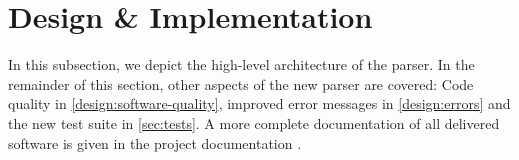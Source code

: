
\section{Design \& Implementation}
In this subsection, we depict the high-level architecture of the parser.
In the remainder of this section, other aspects of the new parser are covered: Code quality in \autoref{design:software-quality}, improved error messages in \autoref{design:errors} and the new test suite in \autoref{sec:tests}.
A more complete documentation of all delivered software is given in the project documentation .\label{sec:design-implementation}








